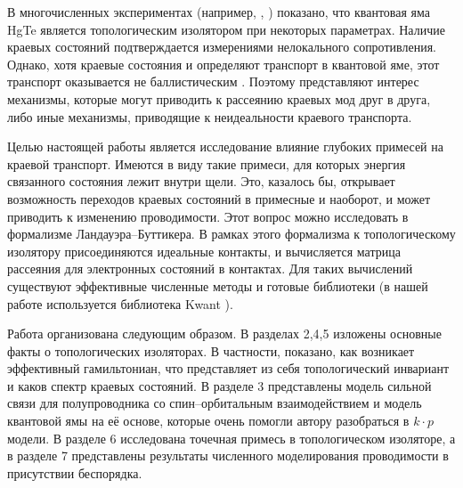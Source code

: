     В многочисленных экспериментах (например, \cite{Konig2007}, \cite{Gusev2011})
    показано, что квантовая яма HgTe является топологическим изолятором при 
    некоторых параметрах. Наличие краевых состояний подтверждается измерениями
    нелокального сопротивления. Однако, хотя краевые состояния и
    определяют транспорт в квантовой яме, этот транспорт оказывается не баллистическим 
    \cite{Gusev2011}.
    Поэтому представляют интерес механизмы, которые могут приводить
    к рассеянию краевых мод друг в друга, либо иные механизмы, приводящие к неидеальности
    краевого транспорта.

    Целью настоящей работы является исследование влияние глубоких примесей на краевой 
    транспорт. Имеются в виду такие примеси, для которых энергия связанного состояния
    лежит внутри щели. Это, казалось бы, открывает возможность переходов краевых
    состояний в примесные и наоборот, и может приводить к изменению проводимости. Этот вопрос
    можно исследовать в формализме Ландауэра--Буттикера. В рамках этого формализма к 
    топологическому изолятору присоединяются идеальные контакты, и вычисляется матрица
    рассеяния для электронных состояний в контактах. Для таких вычислений существуют 
    эффективные численные методы и готовые библиотеки 
    (в нашей работе используется библиотека Kwant \cite{Groth2014}).

    Работа организована следующим образом. В разделах 2,4,5 изложены основные факты о
    топологических изоляторах. В частности, показано, как возникает эффективный гамильтониан, 
    что представляет из себя топологический инвариант и каков спектр краевых состояний. В 
    разделе 3 представлены модель сильной связи для полупроводника со спин--орбитальным
    взаимодействием и модель квантовой ямы на её основе, которые очень помогли автору
    разобраться в $k\cdot p$ модели.
    В разделе 6 исследована точечная примесь в топологическом изоляторе, а в разделе 7 
    представлены результаты численного моделирования проводимости в присутствии беспорядка. 
    

    
